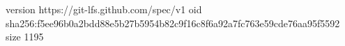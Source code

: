 version https://git-lfs.github.com/spec/v1
oid sha256:f5ee96b0a2bdd88e5b27b5954b82c9f16c8f6a92a7fc763e59cde76aa95f5592
size 1195

